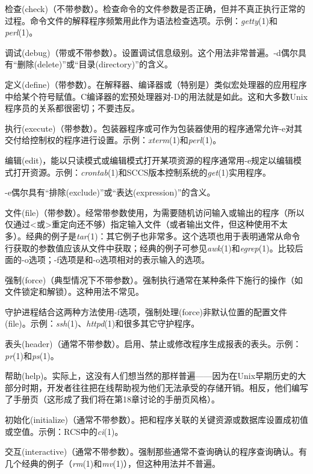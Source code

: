 \documentclass[12pt,oneside]{book}
\begin{document}
\begin{common-format}
\begin{description}
检查(check)（不带参数）。检查命令的文件参数是否正确，但并不真正执行正常的过程。命令文件的解释程序频繁用此作为语法检查选项。示例：\textit{getty}(1)和\textit{perl}(1)。
\item[-d] 调试(debug)（带或不带参数）。设置调试信息级别。这个用法非常普遍。-d偶尔具有“删除(delete)”或“目录(directory)”的含义。
\item[-D] 定义(define)（带参数）。在解释器、编译器或（特别是）类似宏处理器的应用程序中给某个符号赋值。C编译器的宏预处理器对-D的用法就是如此。这和大多数Unix程序员的关系都很密切；不要违反。
\item[-e] 执行(execute)（带参数）。包装器程序或可作为包装器使用的程序通常允许-e对其交付给控制权的程序进行设置。示例：\textit{xterm}(1)和\textit{perl}(1)。

编辑(edit)，能以只读模式或编辑模式打开某项资源的程序通常用-e规定以编辑模式打开资源。示例：\textit{crontab}(1)和SCCS版本控制系统的\textit{get}(1)实用程序。

-e偶尔具有“排除(exclude)”或“表达(expression)”的含义。

\item[-f] 文件(file)（带参数）。经常带参数使用，为需要随机访问输入或输出的程序（所以仅通过<或>重定向还不够）指定输入文件（或者输出文件，但这种使用不太多）。经典的例子是\textit{tar}(1)：其它例子也非常多。这个选项也用于表明通常从命令行获取的参数值应该从文件中获取；经典的例子可参见\textit{awk}(1)和\textit{egrep}(1)。比较后面的-o选项；-f选项是和-o选项相对的表示输入的选项。

强制(force)（典型情况下不带参数）。强制执行通常在某种条件下施行的操作（如文件锁定和解锁）。这种用法不常见。

守护进程结合这两种方法使用-f选项，强制处理(force)非默认位置的配置文件(file)。示例：\textit{ssh}(1)、\textit{httpd}(1)和很多其它守护程序。

\item[-h] 表头(header)（通常不带参数）。启用、禁止或修改程序生成报表的表头。示例：\textit{pr}(1)和\textit{ps}(1)。

帮助(help)。实际上，这没有人们想当然的那样普遍——因为在Unix早期历史的大部分时期，开发者往往把在线帮助视为他们无法承受的存储开销。相反，他们编写了手册页（这形成了我们将在第18章讨论的手册页风格）。

\item[-i] 初始化(initialize)（通常不带参数）。把和程序关联的关键资源或数据库设置成初值或空值。示例：RCS中的\textit{ci}(1)。

交互(interactive)（通常不带参数）。强制那些通常不查询确认的程序查询确认。有几个经典的例子（\textit{rm}(1)和\textit{mv}(1)），但这种用法并不普遍。


\end{description}
\end{common-format}
\end{document}
